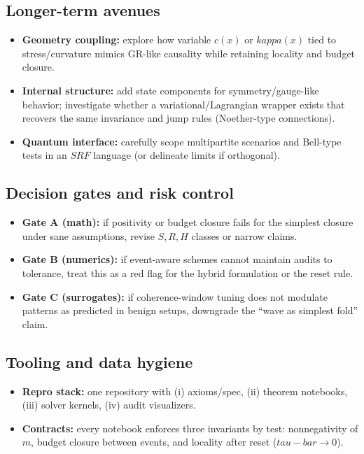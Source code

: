 \documentclass[12pt]{article}
\newcommand{\FoldTime}{\bar{\tau}}
\newcommand{\Threshold}{\kappa}
\newcommand{\Survival}{S}
\newcommand{\Release}{R}
\newcommand{\SRF}{\mathcal{F}_{\mathrm{SR}}}
\def\FoldTime{tau-bar}%
\def\Threshold{kappa}%
\def\SRF{SRF}%
\def\Survival{S}%
\def\Release{R}%
\def\bar#1{#1}%
\def\mathcal#1{#1}%
\def\mathrm#1{#1}%
\begin{document}
\subsection{Longer-term avenues}
\begin{itemize}
  \item \textbf{Geometry coupling:} explore how variable $c(x)$ or $\Threshold(x)$ tied to stress/curvature mimics GR-like causality while retaining locality and budget closure.
  \item \textbf{Internal structure:} add state components for symmetry/gauge-like behavior; investigate whether a variational/Lagrangian wrapper exists that recovers the same invariance and jump rules (Noether-type connections).
  \item \textbf{Quantum interface:} carefully scope multipartite scenarios and Bell-type tests in an $\SRF$ language (or delineate limits if orthogonal).
\end{itemize}

\subsection{Decision gates and risk control}
\begin{itemize}
  \item \textbf{Gate A (math):} if positivity or budget closure fails for the simplest closure under sane assumptions, revise $\Survival,\Release,H$ classes or narrow claims.
  \item \textbf{Gate B (numerics):} if event-aware schemes cannot maintain audits to tolerance, treat this as a red flag for the hybrid formulation or the reset rule.
  \item \textbf{Gate C (surrogates):} if coherence-window tuning does not modulate patterns as predicted in benign setups, downgrade the ``wave as simplest fold'' claim.
\end{itemize}

\subsection{Tooling and data hygiene}
\begin{itemize}
  \item \textbf{Repro stack:} one repository with (i) axioms/spec, (ii) theorem notebooks, (iii) solver kernels, (iv) audit visualizers.
  \item \textbf{Contracts:} every notebook enforces three invariants by test: nonnegativity of $m$, budget closure between events, and locality after reset ($\FoldTime\to 0$).
\end{itemize}
\end{document}
